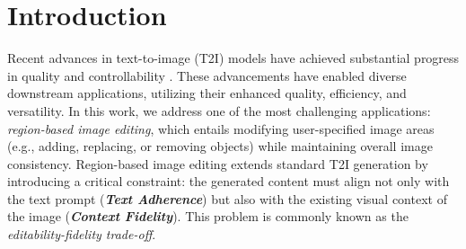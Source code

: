 \documentclass{article}
\begin{document}
%
\section{Introduction}
\label{Sec:intro}
%

Recent advances in text-to-image (T2I) models have achieved substantial progress in quality and controllability \citep{rombach2022high,betker2023improving,chen2023pixart,esser2024scaling,blackforest2024FLUX}. These advancements have enabled diverse downstream applications, utilizing their enhanced quality, efficiency, and versatility. In this work, we address one of the most challenging applications: \emph{region-based image editing}, which entails modifying user-specified image areas (e.g., adding, replacing, or removing objects) while maintaining {overall image consistency}.
Region-based image editing extends standard T2I generation by introducing a critical constraint: the generated content must align not only with the text prompt {(\textbf{\textit{Text Adherence}})} but also with the existing visual context of the image {(\textbf{\textit{Context Fidelity}})}.
This problem is commonly known as the \textit{editability-fidelity trade-off}.
\end{document}
